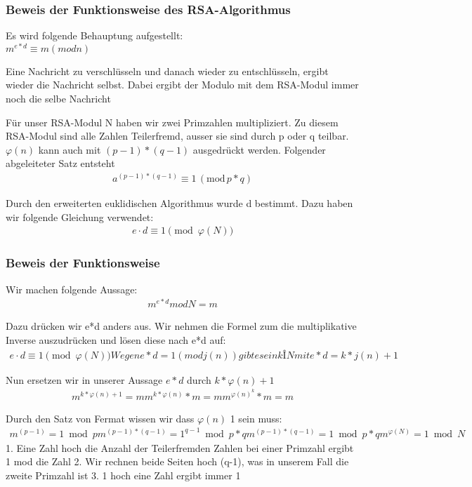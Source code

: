 \subsubsection{Beweis der Funktionsweise des RSA-Algorithmus}


Es wird folgende Behauptung aufgestellt: \\
$ m^{e*d} \equiv m (mod n) $

Eine Nachricht zu verschlüsseln und danach wieder zu entschlüsseln, ergibt wieder die Nachricht selbst. Dabei ergibt der Modulo mit dem RSA-Modul immer noch die selbe Nachricht

Für unser RSA-Modul N haben wir zwei Primzahlen multipliziert. Zu diesem RSA-Modul sind alle Zahlen Teilerfremd, ausser sie sind durch p oder q teilbar. 
$ \varphi(n) $ kann auch mit $ (p-1) * (q-1) $ ausgedrückt werden. Folgender abgeleiteter Satz entsteht 
\begin{align}
	a^{(p-1) * (q-1)} \equiv 1\,(\mathrm{mod}\,p*q)
\end{align}

Durch den erweiterten euklidischen Algorithmus wurde d bestimmt. Dazu haben wir folgende Gleichung verwendet:
\begin{align}   
	e \cdot d \equiv 1 \pmod{\varphi(N)} 
\end{align}


\subsubsection{Beweis der Funktionsweise}
Wir machen folgende Aussage:
\begin{align}   
 m^{e*d} mod N = m
\end{align}

Dazu drücken wir e*d anders aus. Wir nehmen die Formel zum die multiplikative Inverse auszudrücken und lösen diese nach e*d auf:
 \begin{align}    
	e \cdot d \equiv 1 \pmod{\varphi(N)} 
	
	Wegen e*d=1 (mod j(n)) gibt es ein k Î N mit e*d=k* j(n)+1
\end{align}

Nun ersetzen wir in unserer Aussage $ e*d $ durch $ k* \varphi(n)+1 $
 \begin{align}
	m^{k*\varphi(n)+1} = m
	m^{k*\varphi(n)} * m = m
	m^{\varphi(n)}^k * m = m
 \end{align}
 
Durch den Satz von Fermat wissen wir dass $ \varphi(n) $ 1 sein muss:
\begin{align}
  m^{(p-1)} = 1 \bmod p
  m^{(p-1)*(q-1)} = 1^{q-1} \bmod p*q
  m^{(p-1)*(q-1)} = 1 \bmod p*q
  m^{\varphi(N)} = 1 \bmod N
\end{align}
1. Eine Zahl hoch die Anzahl der Teilerfremden Zahlen bei einer Primzahl ergibt 1 mod die Zahl
2. Wir rechnen beide Seiten hoch (q-1), was in unserem Fall die zweite Primzahl ist %
3. 1 hoch eine Zahl ergibt immer 1

